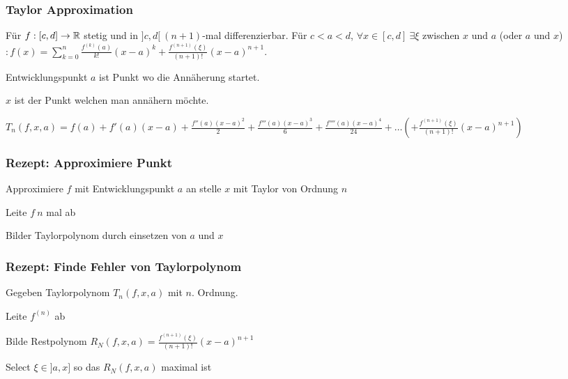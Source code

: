 \subsubsection{Taylor Approximation}
Für $f:[c,d] \to \mathbb{R}$ stetig und in $]c, d[ \ (n+1)$-mal differenzierbar. Für $c < a < d$, $\forall x \in [c, d] \ \exists \xi$ zwischen $x$ und $a$ (oder $a$ und $x$)$: f(x) = \sum_{k=0}^{n} \frac{f^{(k)}(a)}{k!}(x-a)^k + \frac{f^{(n+1)}(\xi)}{(n+1)!}(x-a)^{n+1}$.\\
\begin{compactitem}
    \item Entwicklungspunkt $a$ ist Punkt wo die Annäherung startet.
    \item $x$ ist der Punkt welchen man annähern möchte.
    \item $T_n(f, x, a) = f(a) + f'(a)(x - a) + \frac{f''(a)(x - a)^2}{2} + \frac{f'''(a)(x - a)^3}{6} + \frac{f''''(a)(x - a)^4}{24} + \dots \left(+ \frac{f^{(n+1)}(\xi)}{(n+1)!}(x-a)^{n+1} \right)$
\end{compactitem}

\subsubsection{Rezept: Approximiere Punkt}
Approximiere $f$ mit Entwicklungspunkt $a$ an stelle $x$ mit Taylor von Ordnung $n$
\begin{compactenum}
    \item Leite $f \ n$ mal ab
    \item Bilder Taylorpolynom durch einsetzen von $a$ und $x$
\end{compactenum}

\subsubsection{Rezept: Finde Fehler von Taylorpolynom}
Gegeben Taylorpolynom $T_n(f, x, a)$ mit $n$. Ordnung.
\begin{compactenum}
    \item Leite $f^{(n)}$ ab
\item Bilde Restpolynom $R_N(f, x, a) = \frac{f^{(n+1)}(\xi)}{(n + 1)!}(x - a)^{n + 1}$
    \item Select $\xi \in ]a, x]$ so das $R_N(f, x, a)$ maximal ist 
\end{compactenum}

